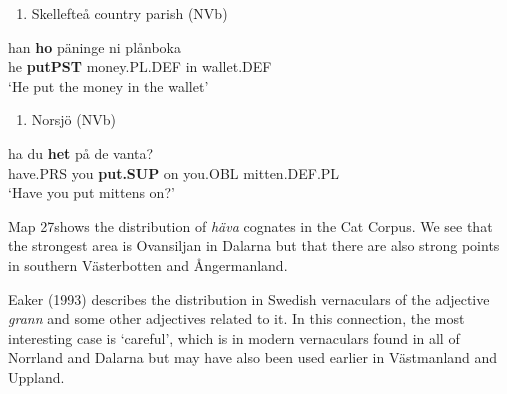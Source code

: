 \begin{enumerate} %
\item 
Skellefteå country parish (NVb)

\end{enumerate} %
\ea\label{}
\gll han  \textbf{ho} päninge  ni  plånboka\\


he  \textbf{putPST} money.PL.DEF  in  wallet.DEF\\ %


‘He put the money in the wallet’
\z


\begin{enumerate} %
\item 
Norsjö (NVb)

\end{enumerate} %
\ea\label{}
\gll ha  du  \textbf{het} på  de  vanta?\\


have.PRS  you  \textbf{put.SUP} on  you.OBL  mitten.DEF.PL\\ %


‘Have you put mittens on?’
\z


Map 27shows the distribution of \textit{häva} cognates in the Cat Corpus. We see that the strongest area is Ovansiljan in Dalarna but that there are also strong points in southern Västerbotten and Ångermanland. 

Eaker (1993) describes the distribution in Swedish vernaculars of the adjective \textit{grann} and some other adjectives related to it. In this connection, the most interesting case is  ‘careful’, which is in modern vernaculars found in all of Norrland and Dalarna but may have also been used earlier in Västmanland and Uppland. 

